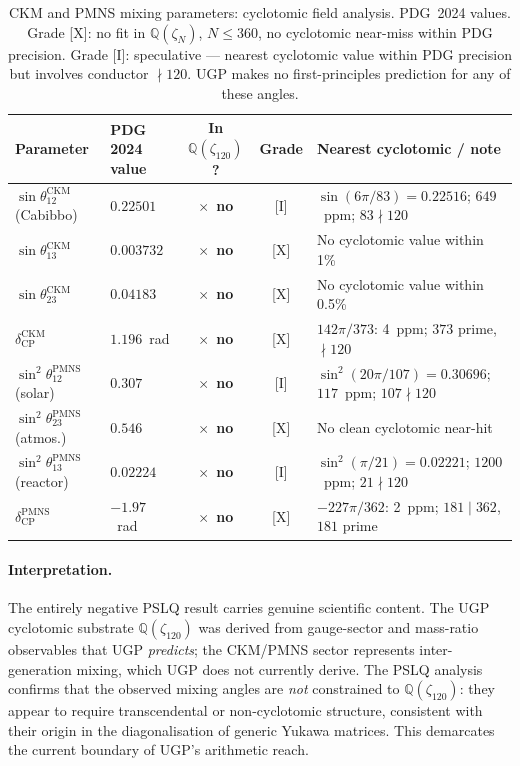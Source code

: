 \documentclass[11pt]{article}
\theoremstyle{remark}
\begin{document}
\begin{table}[H]
\centering
\caption{CKM and PMNS mixing parameters: cyclotomic field analysis.
  PDG~2024 values.  Grade [X]: no fit in $\mathbb{Q}(\zeta_N)$, $N\leq 360$,
  no cyclotomic near-miss within PDG precision.
  Grade [I]: speculative --- nearest cyclotomic value within PDG precision
  but involves conductor $\nmid 120$.
  UGP makes no first-principles prediction for any of these angles.}
\label{tab:ckm_pmns_cyclotomic}
\small
\renewcommand{\arraystretch}{1.1}
\begin{tabular}{llccp{5.2cm}}
\toprule
Parameter & PDG 2024 value & In $\mathbb{Q}(\zeta_{120})$? & Grade
  & Nearest cyclotomic / note \\
\midrule
$\sin\theta_{12}^{\mathrm{CKM}}$ (Cabibbo)
  & $0.22501$
  & $\times$~\textbf{no}
  & [I]
  & $\sin(6\pi/83) = 0.22516$; $649$~ppm; $83 \nmid 120$ \\
$\sin\theta_{13}^{\mathrm{CKM}}$
  & $0.003732$
  & $\times$~\textbf{no}
  & [X]
  & No cyclotomic value within 1\% \\
$\sin\theta_{23}^{\mathrm{CKM}}$
  & $0.04183$
  & $\times$~\textbf{no}
  & [X]
  & No cyclotomic value within 0.5\% \\
$\delta_{\mathrm{CP}}^{\mathrm{CKM}}$
  & $1.196$~rad
  & $\times$~\textbf{no}
  & [X]
  & $142\pi/373$: 4~ppm; $373$ prime, $\nmid 120$ \\
\midrule
$\sin^2\!\theta_{12}^{\mathrm{PMNS}}$ (solar)
  & $0.307$
  & $\times$~\textbf{no}
  & [I]
  & $\sin^2(20\pi/107) = 0.30696$; $117$~ppm; $107 \nmid 120$ \\
$\sin^2\!\theta_{23}^{\mathrm{PMNS}}$ (atmos.)
  & $0.546$
  & $\times$~\textbf{no}
  & [X]
  & No clean cyclotomic near-hit \\
$\sin^2\!\theta_{13}^{\mathrm{PMNS}}$ (reactor)
  & $0.02224$
  & $\times$~\textbf{no}
  & [I]
  & $\sin^2(\pi/21) = 0.02221$; $1200$~ppm; $21\nmid 120$ \\
$\delta_{\mathrm{CP}}^{\mathrm{PMNS}}$
  & $-1.97$~rad
  & $\times$~\textbf{no}
  & [X]
  & $-227\pi/362$: 2~ppm; $181\mid 362$, $181$ prime \\
\bottomrule
\end{tabular}
\end{table}

\paragraph{Interpretation.}
The entirely negative PSLQ result carries genuine scientific content.
The UGP cyclotomic substrate $\mathbb{Q}(\zeta_{120})$ was derived from
gauge-sector and mass-ratio observables that UGP \emph{predicts}; the
CKM/PMNS sector represents inter-generation mixing, which UGP does not
currently derive.  The PSLQ analysis confirms that the observed mixing
angles are \emph{not} constrained to $\mathbb{Q}(\zeta_{120})$: they
appear to require transcendental or non-cyclotomic structure, consistent
with their origin in the diagonalisation of generic Yukawa matrices.
This demarcates the current boundary of UGP's arithmetic reach.
\end{document}
